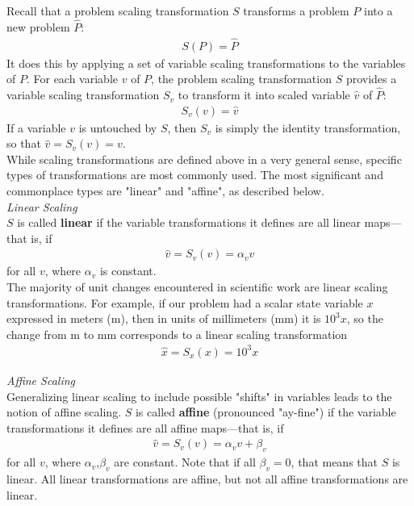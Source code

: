 \documentclass{article}
\begin{document}
Recall that a problem scaling transformation $S$ transforms a problem $P$ into a new problem $\hat{P}$:
\begin{align*}
    S(P) = \hat{P}
\end{align*}
It does this by applying a set of variable scaling transformations to the variables of $P$. For each variable $v$ of $P$, the problem scaling transformation $S$ provides a variable scaling transformation $S_v$ to transform it into scaled variable $\hat{v}$ of $\hat{P}$:
\begin{align*}
    S_v(v) = \hat{v}
\end{align*}
If a variable $v$ is untouched by $S$, then $S_v$ is simply the identity transformation, so that $\hat{v} = S_v(v) = v$. \\

\noindent
While scaling transformations are defined above in a very general sense, specific types of transformations are most commonly used. The most significant and commonplace types are "linear" and "affine", as described below. \\

\noindent \textit{Linear Scaling} \\

\noindent
$S$ is called \textbf{linear} if the variable transformations it defines are all linear maps---that is, if
\begin{align*}
    \hat{v} = S_v(v) = \alpha_v v
\end{align*}
for all $v$, where $\alpha_v$ is constant. \\

\noindent
The majority of unit changes encountered in scientific work are linear scaling transformations. For example, if our problem had a scalar state variable $x$ expressed in meters (m), then in units of millimeters (mm) it is $10^3x$, so the change from m to mm corresponds to a linear scaling transformation
\begin{align*}
    \hat{x} = S_x(x) = 10^3x
\end{align*}


\noindent \textit{Affine Scaling} \\

\noindent
Generalizing linear scaling to include possible "shifts" in variables leads to the notion of affine scaling. $S$ is called \textbf{affine} (pronounced "ay-fine") if the variable transformations it defines are all affine maps---that is, if
\begin{align*}
    \hat{v} = S_v(v) = \alpha_v v + \beta_v
\end{align*}
for all $v$, where $\alpha_v$,$\beta_v$ are constant. Note that if all $\beta_v = 0$, that means that $S$ is linear. All linear transformations are affine, but not all affine transformations are linear. \\
\end{document}
